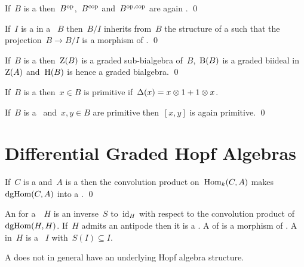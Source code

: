 \documentclass[a4paper,10pt,headings=standardclasses]{scrartcl}
\begin{document}
\begin{lemma}
  If~$B$ is a {\dgb} then~$B^{\mathrm{op}}$,~$B^{\mathrm{cop}}$ and~$B^{\mathrm{op},\mathrm{cop}}$ are again {\dgbs}.
  \qed
\end{lemma}

\begin{lemma}
  If~$I$ is a {\dgbi} in a {\dgb}~$B$ then~$B/I$ inherits from~$B$ the structure of a {\dgb} such that the projection~$B \to B/I$ is a morphism of {\dgb}.
  \qed
\end{lemma}

\begin{proposition}
  If~$B$ is a {\dgb} then~$\operatorname{Z}(B)$ is a graded sub-bialgebra of~$B$,~$\operatorname{B}(B)$ is a graded biideal in~$\operatorname{Z}(A)$ and~$\operatorname{H}(B)$ is hence a graded bialgebra.
  \qed
\end{proposition}

\begin{definition}
  If~$B$ is a {\dgb} then~$x \in B$ is primitive if~$\Delta(x) = x \otimes 1 + 1 \otimes x$.
\end{definition}

\begin{lemma}
  If~$B$ is a~{\dgb} and~$x, y \in B$ are primitive then~$[x,y]$ is again primitive.
  \qed
\end{lemma}






\section{Differential Graded Hopf Algebras}

\begin{lemma}
  If~$C$ is a {\dgc} and~$A$ is a {\dga} then the convolution product on~$\operatorname{Hom}_k(C,A)$ makes~$\operatorname{dgHom}(C,A)$ into a {\dga}.
  \qed
\end{lemma}


\begin{definition}
  An  for a~{\dgb}~$H$ is an inverse~$S$ to~$\operatorname{id}_H$ with respect to the convolution product of~$\operatorname{dgHom}(H,H)$.
  If~$H$ admits an antipode then it is a .
  A  of {\dgh} is a morphism of {\dgbs}.
  A  in~$H$ is a {\dgbi}~$I$ with~$S(I) \subseteq I$.
\end{definition}

\begin{warning}
  A {\dgh} does not in general have an underlying Hopf algebra structure.
\end{warning}
\end{document}
